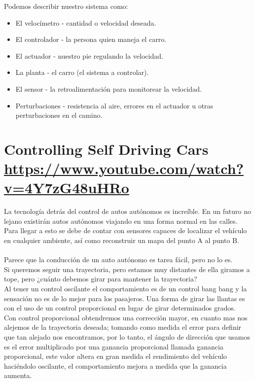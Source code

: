\documentclass[
	12pt, %
]{fphw}
\begin{document}
Podemos describir nuestro sistema como:
\begin{itemize}
\item El velocímetro - cantidad o velocidad deseada.
\item El controlador - la persona quien maneja el carro.
\item El actuador - nuestro pie regulando la velocidad.
\item La planta - el carro (el sistema a controlar).
\item El sensor - la retroalimentación para monitorear la velocidad.
\item Perturbaciones - resistencia al aire, errores en el actuador u otras perturbaciones en el camino.
\end{itemize}

\newpage
\section*{{\color{RoyalPurple}Controlling Self Driving Cars} \url{https://www.youtube.com/watch?v=4Y7zG48uHRo}}

La tecnología detrás del control de autos autónomos es increíble. En un futuro no lejano existirán autos autónomos viajando en una forma normal en las calles. Para llegar a esto se debe de contar con sensores capaces de localizar el vehículo en cualquier ambiente, así como reconstruir un mapa del punto A al punto B.\\\\

Parece que la conducción de un auto autónomo es tarea fácil, pero no lo es.\\
Si queremos seguir una trayectoria, pero estamos muy distantes de ella giramos a tope, pero ¿cuánto debemos girar para mantener la trayectoria?\\
Al tener un control oscilante el comportamiento es de un control bang bang y la sensación no es de lo mejor para los pasajeros. Una forma de girar las llantas es con el uso de un control proporcional en lugar de girar determinados grados.\\
Con control proporcional obtendremos una corrección mayor, en cuanto mas nos alejemos de la trayectoria deseada; tomando como medida el error para definir que tan alejado nos encontramos, por lo tanto, el ángulo de dirección que usamos es el error multiplicado por una ganancia proporcional llamada ganancia proporcional, este valor altera en gran medida el rendimiento del vehículo haciéndolo oscilante, el comportamiento mejora a medida que la ganancia aumenta.\\\\
\end{document}
